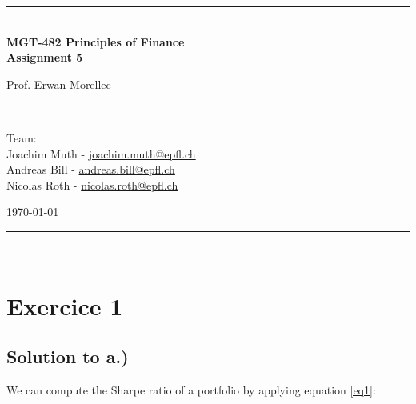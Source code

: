 \documentclass[a4paper,11pt,twoside]{article}
\newcommand{\mail}[1]{{\href{mailto:#1}{#1}}}
\begin{document}
\begin{titlepage} %
\begin{center}
\newcommand{\HRule}{\rule{\linewidth}{0.5mm}} %
\center %
 
 




\begin{figure} [h] %
\centerline{
} 
\end{figure}

\HRule \\[0.4cm]
{ \huge \bfseries MGT-482 Principles of Finance \\Assignment 5}\\[0.4cm] %

\begin{minipage}[t]{0.4\textwidth}
\flushleft
Prof. Erwan Morellec
\end{minipage}
~
\begin{minipage}[t]{0.55\textwidth}
\flushright
Team: \\
Joachim Muth - \mail{joachim.muth@epfl.ch}\\
Andreas Bill - \mail{andreas.bill@epfl.ch}\\
Nicolas Roth - \mail{nicolas.roth@epfl.ch}\\
\end{minipage}
\begin{center}
\today
\end{center}
\HRule \\

\end{center}
\end{titlepage}



\pagestyle{fancy}
\section{Exercice 1}

\subsection{Solution to a.)}
We can compute the Sharpe ratio of a portfolio by applying equation \ref{eq1}:
\end{document}
